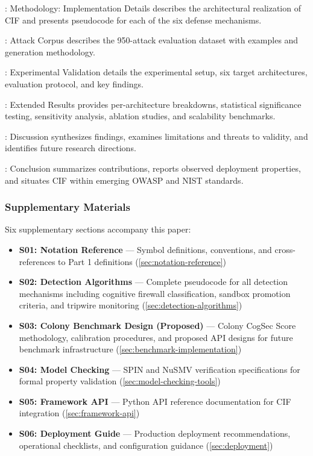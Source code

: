\documentclass[
]{article}
\providecommand{\tightlist}{%
  \setlength{\itemsep}{0pt}\setlength{\parskip}{0pt}}
\begin{document}
\textbf{}: Methodology: Implementation Details
describes the architectural realization of CIF and presents pseudocode
for each of the six defense mechanisms.

\textbf{}: Attack Corpus describes the
950-attack evaluation dataset with examples and generation methodology.

\textbf{}: Experimental Validation details the
experimental setup, six target architectures, evaluation protocol, and
key findings.

\textbf{}: Extended Results provides
per-architecture breakdowns, statistical significance testing,
sensitivity analysis, ablation studies, and scalability benchmarks.

\textbf{}: Discussion synthesizes findings,
examines limitations and threats to validity, and identifies future
research directions.

\textbf{}: Conclusion summarizes contributions,
reports observed deployment properties, and situates CIF within emerging
OWASP and NIST standards.

\subsubsection{Supplementary Materials}\label{supplementary-materials}

Six supplementary sections accompany this paper:

\begin{itemize}
\tightlist
\item
  \textbf{S01: Notation Reference} --- Symbol definitions, conventions,
  and cross-references to Part 1 definitions
  (\cref{sec:notation-reference})
\item
  \textbf{S02: Detection Algorithms} --- Complete pseudocode for all
  detection mechanisms including cognitive firewall classification,
  sandbox promotion criteria, and tripwire monitoring
  (\cref{sec:detection-algorithms})
\item
  \textbf{S03: Colony Benchmark Design (Proposed)} --- Colony CogSec
  Score methodology, calibration procedures, and proposed API designs
  for future benchmark infrastructure
  (\cref{sec:benchmark-implementation})
\item
  \textbf{S04: Model Checking} --- SPIN and NuSMV verification
  specifications for formal property validation
  (\cref{sec:model-checking-tools})
\item
  \textbf{S05: Framework API} --- Python API reference documentation for
  CIF integration (\cref{sec:framework-api})
\item
  \textbf{S06: Deployment Guide} --- Production deployment
  recommendations, operational checklists, and configuration guidance
  (\cref{sec:deployment})
\end{itemize}
\end{document}
